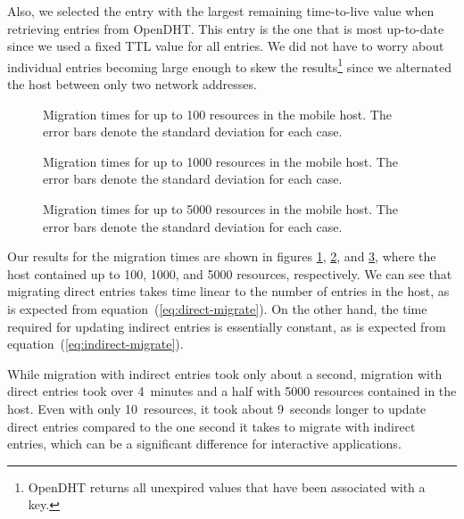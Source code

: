 \documentclass{article}
\begin{document}
Also, we selected the entry with the largest remaining time-to-live
value when retrieving entries from OpenDHT.  This entry is the one
that is most up-to-date since we used a fixed TTL value for all
entries.  We did not have to worry about individual entries becoming
large enough to skew the results\footnote{OpenDHT returns all
  unexpired values that have been associated with a key.} since we
alternated the host between only two network addresses.

\begin{figure}
  \centering
  \caption{Migration times for up to 100 resources in the mobile host.
    The error bars denote the standard deviation for each case.}
  \label{fig:migration-100}
\end{figure}

\begin{figure}
  \centering
  \caption{Migration times for up to 1000 resources in the mobile
    host.  The error bars denote the standard deviation for each
    case.}
  \label{fig:migration-1000}
\end{figure}

\begin{figure}
  \centering
  \caption{Migration times for up to 5000 resources in the mobile
    host.  The error bars denote the standard deviation for each
    case.}
  \label{fig:migration-5000}
\end{figure}

Our results for the migration times are shown in figures
\ref{fig:migration-100}, \ref{fig:migration-1000}, and
\ref{fig:migration-5000}, where the host contained up to 100, 1000,
and 5000 resources, respectively.  We can see that migrating direct
entries takes time linear to the number of entries in the host, as is
expected from equation~(\ref{eq:direct-migrate}).  On the other hand,
the time required for updating indirect entries is essentially
constant, as is expected from equation~(\ref{eq:indirect-migrate}).

While migration with indirect entries took only about a second,
migration with direct entries took over 4~minutes and a half with 5000
resources contained in the host.  Even with only 10~resources, it took
about 9~seconds longer to update direct entries compared to the one
second it takes to migrate with indirect entries, which can be a
significant difference for interactive applications.
\end{document}
